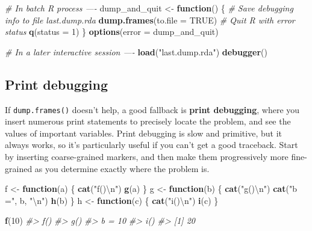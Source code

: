\documentclass[]{book}
\newenvironment{Shaded}{\begin{snugshade}}{\end{snugshade}}
\newcommand{\CharTok}[1]{\textcolor[rgb]{0.5,0.5,0.5}{#1}}
\newcommand{\CommentTok}[1]{\textcolor[rgb]{0.37,0.37,0.37}{\textit{#1}}}
\newcommand{\ControlFlowTok}[1]{\textcolor[rgb]{0.27,0.27,0.27}{\textbf{#1}}}
\newcommand{\DataTypeTok}[1]{\textcolor[rgb]{0.27,0.27,0.27}{#1}}
\newcommand{\DecValTok}[1]{\textcolor[rgb]{0.06,0.06,0.06}{#1}}
\newcommand{\KeywordTok}[1]{\textcolor[rgb]{0.27,0.27,0.27}{\textbf{#1}}}
\newcommand{\NormalTok}[1]{#1}
\newcommand{\OtherTok}[1]{\textcolor[rgb]{0.37,0.37,0.37}{#1}}
\newcommand{\StringTok}[1]{\textcolor[rgb]{0.5,0.5,0.5}{#1}}
\begin{document}
\begin{Shaded}
\begin{Highlighting}[]
\CommentTok{# In batch R process ----}
\NormalTok{dump_and_quit <-}\StringTok{ }\ControlFlowTok{function}\NormalTok{() \{}
  \CommentTok{# Save debugging info to file last.dump.rda}
  \KeywordTok{dump.frames}\NormalTok{(}\DataTypeTok{to.file =} \OtherTok{TRUE}\NormalTok{)}
  \CommentTok{# Quit R with error status}
  \KeywordTok{q}\NormalTok{(}\DataTypeTok{status =} \DecValTok{1}\NormalTok{)}
\NormalTok{\}}
\KeywordTok{options}\NormalTok{(}\DataTypeTok{error =}\NormalTok{ dump_and_quit)}

\CommentTok{# In a later interactive session ----}
\KeywordTok{load}\NormalTok{(}\StringTok{"last.dump.rda"}\NormalTok{)}
\KeywordTok{debugger}\NormalTok{()}
\end{Highlighting}
\end{Shaded}

\hypertarget{print-debugging}{%
\subsection{Print debugging}\label{print-debugging}}


If \texttt{dump.frames()} doesn't help, a good fallback is \textbf{print debugging}, where you insert numerous print statements to precisely locate the problem, and see the values of important variables. Print debugging is slow and primitive, but it always works, so it's particularly useful if you can't get a good traceback. Start by inserting coarse-grained markers, and then make them progressively more fine-grained as you determine exactly where the problem is.

\begin{Shaded}
\begin{Highlighting}[]
\NormalTok{f <-}\StringTok{ }\ControlFlowTok{function}\NormalTok{(a) \{}
  \KeywordTok{cat}\NormalTok{(}\StringTok{"f()}\CharTok{\textbackslash{}n}\StringTok{"}\NormalTok{)}
  \KeywordTok{g}\NormalTok{(a)}
\NormalTok{\}}
\NormalTok{g <-}\StringTok{ }\ControlFlowTok{function}\NormalTok{(b) \{}
  \KeywordTok{cat}\NormalTok{(}\StringTok{"g()}\CharTok{\textbackslash{}n}\StringTok{"}\NormalTok{)}
  \KeywordTok{cat}\NormalTok{(}\StringTok{"b ="}\NormalTok{, b, }\StringTok{"}\CharTok{\textbackslash{}n}\StringTok{"}\NormalTok{)}
  \KeywordTok{h}\NormalTok{(b)}
\NormalTok{\}}
\NormalTok{h <-}\StringTok{ }\ControlFlowTok{function}\NormalTok{(c) \{}
  \KeywordTok{cat}\NormalTok{(}\StringTok{"i()}\CharTok{\textbackslash{}n}\StringTok{"}\NormalTok{)}
  \KeywordTok{i}\NormalTok{(c)}
\NormalTok{\}}

\KeywordTok{f}\NormalTok{(}\DecValTok{10}\NormalTok{)}
\CommentTok{#> f()}
\CommentTok{#> g()}
\CommentTok{#> b = 10 }
\CommentTok{#> i()}
\CommentTok{#> [1] 20}
\end{Highlighting}
\end{Shaded}
\end{document}
